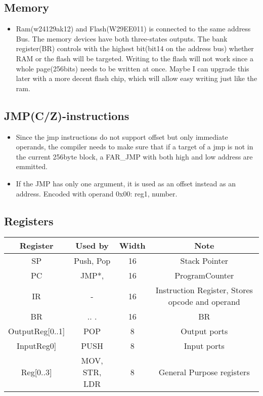 \documentclass[a4paper, 12pt]{article}
\begin{document}
	\subsection{Memory}
	\begin{itemize}
		\item Ram(w24129ak12) and Flash(W29EE011) is connected to the same address Bus. The memory devices have both three-states outputs. The bank register(BR) controls with the highest bit(bit14 on the address bus) whether RAM or the flash will be targeted. Writing to the flash will not work since a whole page(256bits) needs to be written at once. Maybe I can upgrade this later with a more decent flash chip, which will allow easy writing just like the ram.
	\end{itemize}

	\subsection{JMP(C/Z)-instructions}
	\begin{itemize}
		\item Since the jmp instructions do not support offset but only immediate operands, the compiler needs to make sure that if a target of a jmp is not in the current 256byte block, a FAR\_JMP with both  high and low address are emmitted.
		\item If the JMP has only one argument, it is used as an offset instead as an address. Encoded with operand 0x00: reg1, number.
	\end{itemize}

	\subsection {Registers}
	\small\begin{center}
		\begin{tabular}{|c|c|c|c|}
			\hline
			Register & Used by & Width & Note\\ \hline
			SP & Push, Pop & 16 & Stack Pointer\\ \hline
			PC & JMP*, & 16 & ProgramCounter\\ \hline
			IR & - & 16 & Instruction Register, Stores opcode and operand\\ \hline
			BR & .. . & 16 & BR\\\hline
			OutputReg[0..1] & POP & 8 & Output ports\\ \hline
			InputReg0] & PUSH & 8 & Input ports\\ \hline
			Reg[0..3] & MOV, STR, LDR & 8 & General Purpose registers\\ \hline
		\end{tabular}
	\end{center}
	\newpage
\end{document}
